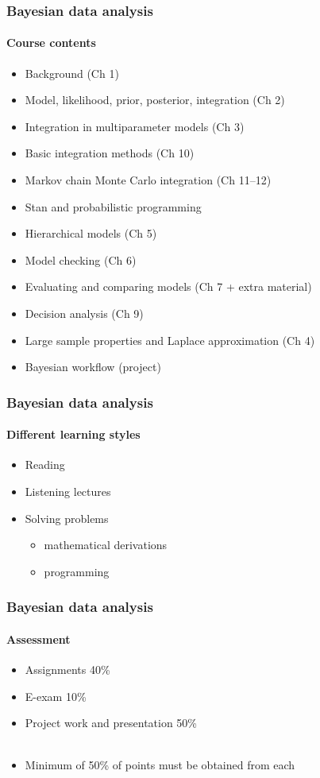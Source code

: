 \documentclass[english,t]{beamer}
\begin{document}
\begin{frame}
  \frametitle{Bayesian data analysis}  %
  \framesubtitle{Course contents}
  \begin{itemize}
  \item Background (Ch 1)
  \item Model, likelihood, prior, posterior, integration (Ch 2)
  \item Integration in multiparameter models (Ch 3)
  \item Basic integration methods (Ch 10)
  \item Markov chain Monte Carlo integration (Ch 11--12)
  \item Stan and probabilistic programming
  \item Hierarchical models (Ch 5)
  \item Model checking (Ch 6)
  \item Evaluating and comparing models (Ch 7 + extra material)
  \item Decision analysis (Ch 9)
  \item Large sample properties and Laplace approximation (Ch 4)
  \item Bayesian workflow (project)
  \end{itemize}
  
\end{frame}


\begin{frame}
  \frametitle{Bayesian data analysis}  %
  \framesubtitle{Different learning styles}

  \begin{itemize}
  \item Reading
  \item Listening lectures
  \item Solving problems
    \begin{itemize}
    \item mathematical derivations
    \item programming
    \end{itemize}
  \end{itemize}
  
\end{frame}

\begin{frame}
  \frametitle{Bayesian data analysis}  %
  \framesubtitle{Assessment}
    \begin{itemize}
    \item Assignments 40\%
    \item E-exam 10\%
    \item Project work and presentation 50\%\\~
    \item Minimum of 50\% of points must be obtained from each
    \end{itemize}

\end{frame}
\end{document}
